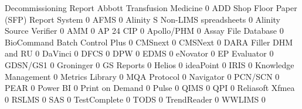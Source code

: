 \documentclass{article}
\begin{document}
\begin{Schunk}
\begin{Soutput}
                                           Decommissioning Report
  Abbott Transfusion Medicine                                   0
  ADD Shop Floor Paper (SFP) Report System                      0
  AFMS                                                          0
  Alinity S Non-LIMS spreadsheets                               0
  Alinity Source Verifier                                       0
  AMM                                                           0
  AP 24 CIP                                                     0
  Apollo/PHM                                                    0
  Assay File Database                                           0
  BioCommand Batch Control Plus                                 0
  CMSnext                                                       0
  CMSNext                                                       0
  DARA Filler DHM and RU                                        0
  DaVinci                                                       0
  DFCS                                                          0
  DPW                                                           0
  EDMS                                                          0
  eNovator                                                      0
  EP Evaluator                                                  0
  GDSN/GS1                                                      0
  Groninger                                                     0
  GS Reports                                                    0
  Helios                                                        0
  ideaPoint                                                     0
  IRIS                                                          0
  Knowledge Management                                          0
  Metrics Library                                               0
  MQA Protocol                                                  0
  Navigator                                                     0
  PCN/SCN                                                       0
  PEAR                                                          0
  Power BI                                                      0
  Print on Demand                                               0
  Pulse                                                         0
  QIMS                                                          0
  QPI                                                           0
  Reliasoft Xfmea                                               0
  RSLMS                                                         0
  SAS                                                           0
  TestComplete                                                  0
  TODS                                                          0
  TrendReader                                                   0
  WWLIMS                                                        0
                                          

\end{Soutput}
\end{Schunk}
\end{document}
